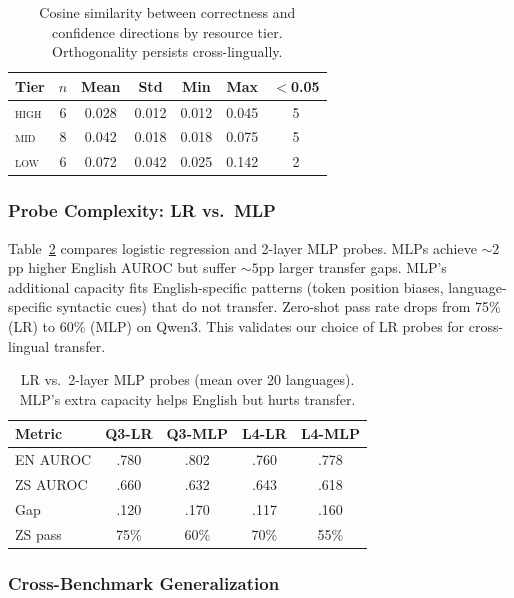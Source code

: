 \documentclass[11pt,a4paper]{article}
\newcommand{\auroc}{AUROC}
\begin{document}
\begin{table}[t]
\centering
\small
\begin{tabular}{lcccccc}
\toprule
Tier & $n$ & Mean & Std & Min & Max & $<$0.05 \\
\midrule
\textsc{high} & 6 & 0.028 & 0.012 & 0.012 & 0.045 & 5 \\
\textsc{mid}  & 8 & 0.042 & 0.018 & 0.018 & 0.075 & 5 \\
\textsc{low}  & 6 & 0.072 & 0.042 & 0.025 & 0.142 & 2 \\
\bottomrule
\end{tabular}
\caption{Cosine similarity between correctness and confidence directions by resource tier. Orthogonality persists cross-lingually.}
\label{tab:orthogonality}
\end{table}


\subsubsection{Probe Complexity: LR vs.\ MLP}
\label{sec:probe_complexity}

Table~\ref{tab:lr_mlp} compares logistic regression and 2-layer MLP probes. MLPs achieve ${\sim}2$pp higher English \auroc{} but suffer ${\sim}5$pp larger transfer gaps. MLP's additional capacity fits English-specific patterns (token position biases, language-specific syntactic cues) that do not transfer. Zero-shot pass rate drops from 75\% (LR) to 60\% (MLP) on Qwen3. This validates our choice of LR probes for cross-lingual transfer.

\begin{table}[t]
\centering
\small
\begin{tabular}{lcccc}
\toprule
Metric & Q3-LR & Q3-MLP & L4-LR & L4-MLP \\
\midrule
EN \auroc{} & .780 & .802 & .760 & .778 \\
ZS \auroc{} & .660 & .632 & .643 & .618 \\
Gap & .120 & .170 & .117 & .160 \\
ZS pass & 75\% & 60\% & 70\% & 55\% \\
\bottomrule
\end{tabular}
\caption{LR vs.\ 2-layer MLP probes (mean over 20 languages). MLP's extra capacity helps English but hurts transfer.}
\label{tab:lr_mlp}
\end{table}


\subsubsection{Cross-Benchmark Generalization}
\label{sec:benchmarks}
\end{document}

